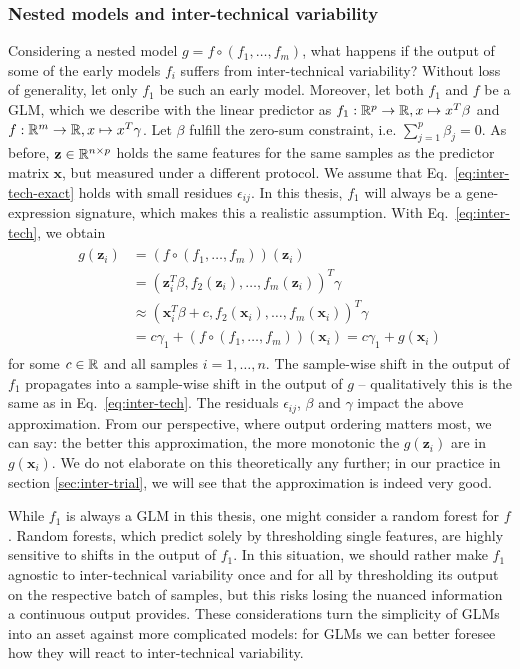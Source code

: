 \subsubsection{Nested models and inter-technical variability}

Considering a nested model $g = f \circ (f_1, \ldots, f_m)$, what happens if the output of some of 
the early models $f_i$ suffers from inter-technical variability? Without loss of generality, let 
only $f_1$ be such an early model. Moreover, let both $f_1$ and $f$ be a GLM, which we describe 
with the linear predictor as $f_1: \mathbb{R}^p \to \mathbb{R}, x \mapsto x^T \beta$ and $f: \mathbb{R}^m \to \mathbb{R}, 
x \mapsto x^T \gamma$. Let $\beta$ fulfill the zero-sum constraint, i.e. $\sum_{j=1}^p \beta_j = 0$.
As before, $\mathbf{z} \in \mathbb{R}^{n \times p}$ holds the same features for the same samples as the 
predictor matrix $\mathbf{x}$, but measured under a different protocol.
We assume that Eq.\ \ref{eq:inter-tech-exact} holds with small residues $\epsilon_{ij}$. In this 
thesis, $f_1$ will always be a gene-expression signature, which makes this a realistic assumption. 
With Eq.\ \ref{eq:inter-tech}, we obtain
\begin{align}\label{eq:inter-tech-nested}
\begin{split}
    g(\mathbf{z}_i) &= (f \circ (f_1, \ldots, f_m))(\mathbf{z}_i) \\ 
    &= (\mathbf{z}_i^T \beta, f_2(\mathbf{z}_i), \ldots, f_m(\mathbf{z}_i))^T \gamma \\
    &\approx (\mathbf{x}_i^T \beta + c, f_2(\mathbf{x}_i), \ldots, f_m(\mathbf{x}_i))^T \gamma \\ 
    &= c \gamma_1 + (f \circ (f_1, \ldots, f_m))(\mathbf{x}_i) = c \gamma_1 + g(\mathbf{x}_i)
\end{split}
\end{align}
for some $c \in \mathbb{R}$ and all samples $i = 1, \ldots, n$. The sample-wise shift in the output of 
$f_1$ propagates into a sample-wise shift in the output of $g$ -- qualitatively this is the same 
as in Eq.\ \ref{eq:inter-tech}. The residuals $\epsilon_{ij}$, $\beta$ and $\gamma$ impact the 
above approximation. From our 
perspective, where output ordering matters most, we can say: the better this approximation, the more 
monotonic the $g(\mathbf{z}_i)$ are in $g(\mathbf{x}_i)$. We do not elaborate on this theoretically any further; 
in our practice in section \ref{sec:inter-trial}, we will see that the approximation is indeed
very good.

While $f_1$ is always a GLM in this thesis, one might consider a random forest for $f$. Random 
forests, which predict solely by thresholding single features, are highly sensitive to shifts in 
the output of $f_1$. In this situation, we should rather make $f_1$ agnostic to inter-technical 
variability once and 
for all by thresholding its output on the respective batch of samples, but this risks losing the 
nuanced information a continuous output provides. These considerations turn the simplicity of GLMs 
into an asset against more complicated models: for GLMs we can better foresee how they will react 
to inter-technical variability.

